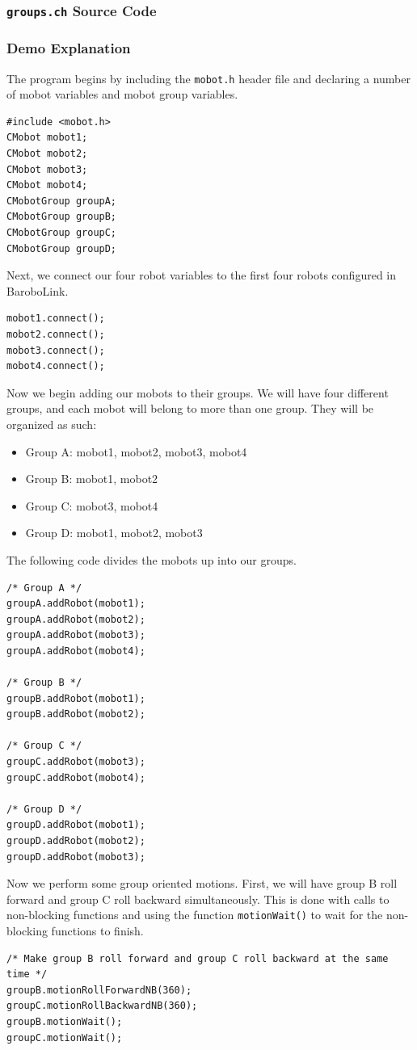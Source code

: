 \documentclass{article}
\begin{document}
\subsubsection{\texttt{groups.ch} Source Code}

\subsubsection{Demo Explanation}
The program begins by including the \texttt{mobot.h} header file
and declaring a number of mobot variables and mobot group variables.
\begin{verbatim}
#include <mobot.h>
CMobot mobot1;
CMobot mobot2;
CMobot mobot3;
CMobot mobot4;
CMobotGroup groupA;
CMobotGroup groupB;
CMobotGroup groupC;
CMobotGroup groupD;
\end{verbatim}

Next, we connect our four robot variables to the first four robots 
configured in BaroboLink.
\begin{verbatim}
mobot1.connect();
mobot2.connect();
mobot3.connect();
mobot4.connect();
\end{verbatim}

Now we begin adding our mobots to their groups. We will have four different groups, and each mobot
will belong to more than one group. They will be organized as such:
\begin{itemize}
\item Group A: mobot1, mobot2, mobot3, mobot4
\item Group B: mobot1, mobot2
\item Group C: mobot3, mobot4
\item Group D: mobot1, mobot2, mobot3
\end{itemize}
The following code divides the mobots up into our groups.
\begin{verbatim}
/* Group A */
groupA.addRobot(mobot1);
groupA.addRobot(mobot2);
groupA.addRobot(mobot3);
groupA.addRobot(mobot4);

/* Group B */
groupB.addRobot(mobot1);
groupB.addRobot(mobot2);

/* Group C */
groupC.addRobot(mobot3);
groupC.addRobot(mobot4);

/* Group D */
groupD.addRobot(mobot1);
groupD.addRobot(mobot2);
groupD.addRobot(mobot3);
\end{verbatim}

Now we perform some group oriented motions. First, we will have group B roll forward and group C
roll backward simultaneously. This is done with calls to non-blocking functions and using the
function \texttt{motionWait()} to wait for the non-blocking functions to finish.
\begin{verbatim}
/* Make group B roll forward and group C roll backward at the same time */
groupB.motionRollForwardNB(360);
groupC.motionRollBackwardNB(360);
groupB.motionWait();
groupC.motionWait();
\end{verbatim}
\end{document}
